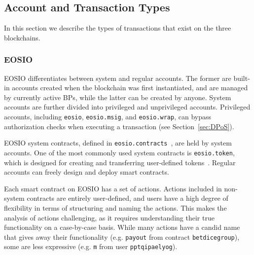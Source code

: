 









\subsection{Account and Transaction Types}
In this section we describe the types of transactions that exist on the three blockchains.

\subsubsection{EOSIO}
EOSIO differentiates between system and regular accounts.
The former are built-in accounts created when the blockchain was first instantiated, and are managed by currently active BPs, while the latter can be created by anyone.
System accounts are further divided into privileged and unprivileged accounts. 
Privileged accounts, including \texttt{eosio}, \texttt{eosio.msig}, and \texttt{eosio.wrap}, can bypass authorization checks when executing a transaction \cite{EOSIO2019, Kauffman2019} (see Section~\ref{sec:DPoS}).

EOSIO system contracts, defined in \texttt{eosio.contracts}~\cite{EOSIO2020}, are held by system accounts. 
One of the most commonly used system contracts is \texttt{eosio.token}, which is designed for creating and transferring user-defined tokens~\cite{EOSIO2019}.
Regular accounts can freely design and deploy smart contracts. 

Each smart contract on EOSIO has a set of actions. 
Actions included in non-system contracts are entirely user-defined, and users have a high degree of flexibility in terms of structuring and naming the actions. 
This makes the analysis of actions challenging, as it requires understanding their true functionality on a case-by-case basis. 
While many actions have a candid name that gives away their functionality (e.g. \texttt{payout} from contract \texttt{betdicegroup}), some are less expressive (e.g. \texttt{m} from user \texttt{pptqipaelyog}).

